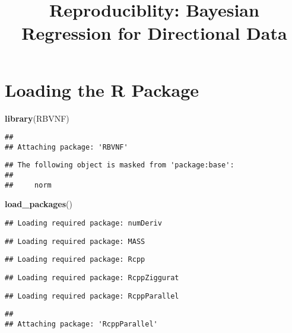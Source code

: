 \documentclass[
]{article}
\title{Reproduciblity: Bayesian Regression for Directional Data}
\author{}
\date{\vspace{-2.5em}}
\newenvironment{Shaded}{\begin{snugshade}}{\end{snugshade}}
\newcommand{\FunctionTok}[1]{\textcolor[rgb]{0.13,0.29,0.53}{\textbf{#1}}}
\newcommand{\NormalTok}[1]{#1}
\begin{document}
\maketitle

\hypertarget{loading-the-r-package}{%
\section{Loading the R Package}\label{loading-the-r-package}}

\begin{Shaded}
\begin{Highlighting}[]
\FunctionTok{library}\NormalTok{(RBVNF)}
\end{Highlighting}
\end{Shaded}

\begin{verbatim}
## 
## Attaching package: 'RBVNF'
\end{verbatim}

\begin{verbatim}
## The following object is masked from 'package:base':
## 
##     norm
\end{verbatim}

\begin{Shaded}
\begin{Highlighting}[]
\FunctionTok{load\_packages}\NormalTok{()}
\end{Highlighting}
\end{Shaded}

\begin{verbatim}
## Loading required package: numDeriv
\end{verbatim}

\begin{verbatim}
## Loading required package: MASS
\end{verbatim}

\begin{verbatim}
## Loading required package: Rcpp
\end{verbatim}

\begin{verbatim}
## Loading required package: RcppZiggurat
\end{verbatim}

\begin{verbatim}
## Loading required package: RcppParallel
\end{verbatim}

\begin{verbatim}
## 
## Attaching package: 'RcppParallel'
\end{verbatim}
\end{document}
